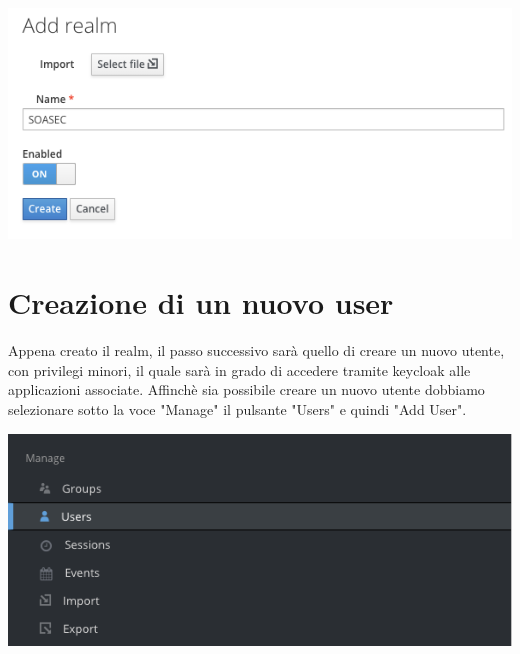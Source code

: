 \documentclass[twoside]{report}
\begin{document}
\begin{minipage}{\linewidth}
    \vspace{2mm}
    \centering
    \includegraphics[width= \linewidth]{4.png}
    \vspace{2mm}
\end{minipage}
\newpage
\section{Creazione di un nuovo user}

Appena creato il realm, il passo successivo sarà quello di creare un nuovo utente, con privilegi minori, il quale sarà in grado di accedere tramite keycloak alle applicazioni associate.
\bigbreak
Affinchè sia possibile creare un nuovo utente dobbiamo selezionare sotto la voce "Manage" il pulsante "Users" e quindi "Add User".

\begin{center}
\begin{minipage}{0.6\linewidth}
    \vspace{2mm}
    \centering
    \includegraphics[width= \linewidth]{5.png}
    \vspace{2mm}
\end{minipage}
\end{center}
\end{document}
